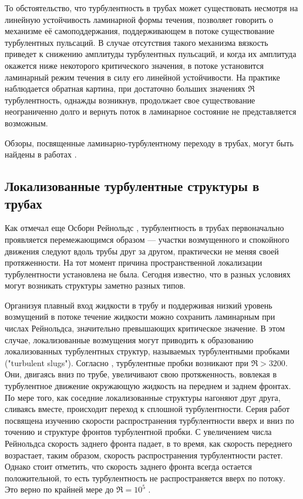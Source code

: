 То обстоятельство, что турбулентность в трубах может существовать несмотря на линейную устойчивость ламинарной формы течения, позволяет говорить о механизме её самоподдержания, поддерживающем в потоке существование турбулентных пульсаций. В случае отсутствия такого механизма вязкость приведет к снижению амплитуды турбулентных пульсаций, и когда их амплитуда окажется ниже некоторого критического значения, в потоке установится ламинарный режим течения в силу его линейной устойчивости. На практике наблюдается обратная картина, при достаточно больших значениях $\Re$ турбулентность, однажды возникнув, продолжает свое существование неограниченно долго и вернуть поток в ламинарное состояние не представляется возможным. 

Обзоры, посвященные ламинарно-турбулентному переходу в трубах, могут быть найдены в работах \cite{Kerswell2005, Manneville2016, Kreilos2014, Barkley2016}. 


	\subsection{Локализованные турбулентные структуры в трубах}

Как отмечал еще Осборн Рейнольдс \cite{Reynolds1883}, турбулентность в трубах первоначально проявляется перемежающимся образом --- участки возмущенного и спокойного движения следуют вдоль трубы друг за другом, практически не меняя своей протяженности. На тот момент причина пространственной локализации турбулентности установлена не была. Сегодня известно, что в разных условиях могут возникать структуры заметно разных типов. 

Организуя плавный вход жидкости в трубу и поддерживая низкий уровень возмущений в потоке течение жидкости можно сохранить ламинарным при числах Рейнольдса, значительно превышающих критическое значение. В этом случае, локализованные возмущения могут приводить к образованию локализованных турбулентных структур, называемых турбулентными пробками ("turbulent slugs"). Согласно \cite{Wygnanski1973}, турбулентные пробки возникают при $\Re > 3200$. Они, двигаясь вниз по трубе, увеличивают свою протяженность, вовлекая в турбулентное движение окружающую жидкость на переднем и заднем фронтах. По мере того, как соседние локализованные структуры нагоняют друг друга, сливаясь вместе, происходит переход к сплошной турбулентности. Серия работ посвящена изучению скорости распространения турбулентности вверх и вниз по точению \cite{Lindgren1969, Wygnanski1973, Nishi2008, Duguet2010, Barkley2015} и структуре фронтов турбулентной пробки. С увеличением числа Рейнольдса скорость заднего фронта падает, в то время, как скорость переднего возрастает, таким образом, скорость распространения турбулентности растет. Однако стоит отметить, что скорость заднего фронта всегда остается положительной, то есть турбулентность не распространяется вверх по потоку. Это верно по крайней мере до $\Re = 10^5$ \cite{Wygnanski1973}. 

